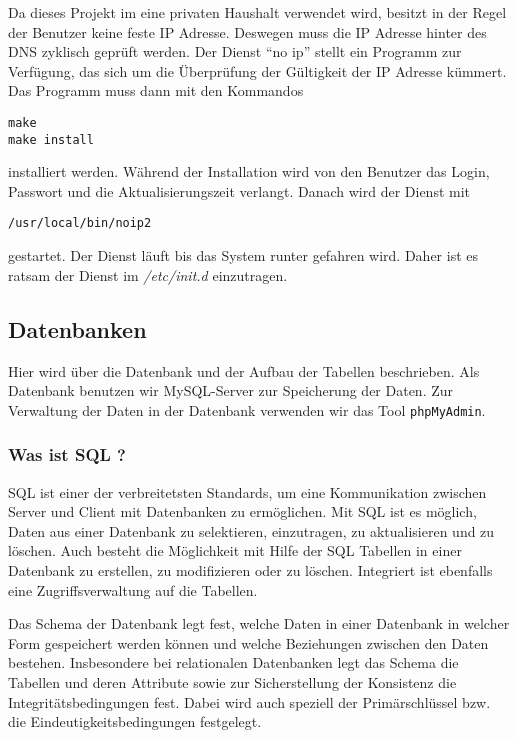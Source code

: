 Da dieses Projekt im eine privaten Haushalt verwendet wird, besitzt in der Regel der Benutzer keine feste IP Adresse. Deswegen muss die IP Adresse hinter des DNS zyklisch geprüft werden. Der Dienst ``no ip'' stellt ein Programm zur Verfügung, das sich um die Überprüfung der Gültigkeit der IP Adresse kümmert. Das Programm muss dann mit den Kommandos

\begin{lstlisting}
make
make install
\end{lstlisting}

installiert werden. Während der Installation wird von den Benutzer das Login, Passwort und die Aktualisierungszeit verlangt. Danach wird der Dienst mit

\begin{lstlisting}
/usr/local/bin/noip2
\end{lstlisting}

gestartet. Der Dienst läuft bis das System runter gefahren wird. Daher ist es ratsam der Dienst im \textit{/etc/init.d} einzutragen.

\subsection{Datenbanken}
Hier wird über die Datenbank und der Aufbau der Tabellen beschrieben. Als Datenbank benutzen wir MySQL-Server zur Speicherung der Daten. Zur Verwaltung der Daten in der Datenbank verwenden wir das Tool \texttt{phpMyAdmin}.

\subsubsection{Was ist SQL ?}
SQL ist einer der verbreitetsten Standards, um eine Kommunikation zwischen Server und Client mit Datenbanken zu ermöglichen. Mit SQL ist es möglich, Daten aus einer Datenbank zu selektieren, einzutragen, zu aktualisieren und zu löschen. Auch besteht die Möglichkeit mit Hilfe der SQL Tabellen in einer Datenbank zu erstellen, zu modifizieren oder zu löschen. Integriert ist ebenfalls eine Zugriffsverwaltung auf die Tabellen. 

Das Schema der Datenbank legt fest, welche Daten in einer Datenbank in welcher Form gespeichert werden können und welche Beziehungen zwischen den Daten bestehen. Insbesondere bei relationalen Datenbanken legt das Schema die Tabellen und deren Attribute sowie zur Sicherstellung der Konsistenz die Integritätsbedingungen fest. Dabei wird auch speziell der Primärschlüssel bzw. die Eindeutigkeitsbedingungen festgelegt.

